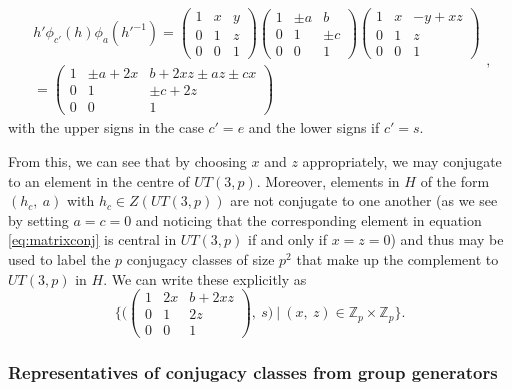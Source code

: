 \documentclass[12pt]{article}
\theoremstyle{definition}
\begin{document}
\begin{equation}
\begin{gathered}
h'\phi_{c'}(h)\phi_a(h'^{-1}) =
\begin{pmatrix}
1 & x & y \\
0 & 1 & z \\
0 & 0 & 1
\end{pmatrix}
\begin{pmatrix}
1 & \pm a & b \\
0 & 1 & \pm c \\
0 & 0 & 1
\end{pmatrix}
\begin{pmatrix}
1 & x & -y + xz \\
0 & 1 & z \\
0 & 0 & 1
\end{pmatrix} \\
=
\begin{pmatrix}
1 & \pm a + 2x & b + 2xz \pm az \pm cx \\
0 & 1 & \pm c + 2z \\
0 & 0 & 1
\end{pmatrix}
\end{gathered},
\label{eq:matrixconj}
\end{equation}
with the upper signs in the case $c' = e$ and the lower signs if $c' = s$.

From this, we can see that by choosing $x$ and $z$ appropriately, we may conjugate to an element in the centre of $UT(3,p)$. Moreover, elements in $H$ of the form $(h_c,~a)$ with $h_c \in Z(UT(3,p))$ are not conjugate to one another (as we see by setting $a=c=0$ and noticing that the corresponding element in equation \ref{eq:matrixconj} is central in $UT(3,p)$ if and only if $x=z=0$) and thus may be used to label the $p$ conjugacy classes of size $p^2$ that make up the complement to $UT(3,p)$ in $H$. We can write these explicitly as
\begin{equation}
\bigg\{ \bigg(
\begin{pmatrix}
1 & 2x & b + 2xz \\
0 & 1 & 2z \\
0 & 0 & 1
\end{pmatrix},~s \bigg)~|~(x,~z) \in \mathbb{Z}_p \times \mathbb{Z}_p \bigg\}.
\end{equation}

\subsubsection*{Representatives of conjugacy classes from group generators}
\end{document}
